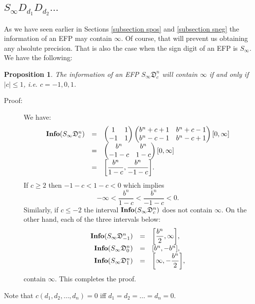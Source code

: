 \documentclass[11pt,a4paper]{article}
\newtheorem{prop}[tm]{Proposition}
\newenvironment{proof}
	{ \begin{description} \item[Proof:] \footnotesize }
	{ \end{description} }
\begin{document}
\subsection{$S_\infty D_{d_1} D_{d_2} \ldots$}
As we have seen earlier in Sections \ref{subsection spos} and
	\ref{subsection sneg} the information of an EFP may contain $\infty$.
	Of course, that will prevent us obtaining any absolute precision. That
	is also the case when the sign digit of an EFP is $S_\infty$. We have
	the following:
	\begin{prop} \label{prop:the information containing infty}
		The information of an EFP $S_\infty \mathfrak{D}_c^n$ will contain
		$\infty$ if and only if $|c| \le 1$, i.e. $c=-1,0,1$.
	\end{prop}
	\begin{proof}
		We have:
		\[ \begin{array}{rcl}
			{\bf Info} (S_\infty \mathfrak{D}_c^n) &=& \begin{pmatrix} 1&1\\-1&1
				\end{pmatrix} \begin{pmatrix} b^n+c+1 & b^n+c-1\\ b^n-c-1 & b^n-c+1
				\end{pmatrix} [0,\infty] \\
			&=& \begin{pmatrix} b^n & b^n \\ -1-c & 1-c \end{pmatrix} [0,\infty] \\
			&=& \displaystyle{ \left[ \frac{b^n}{1-c}, \frac{b^n}{-1-c} \right] }.
		\end{array} \]
		If $c \ge 2$ then $-1-c < 1-c <0$ which implies
		\[ -\infty < \frac{b^n}{1-c} < \frac{b^n}{-1-c} < 0. \]
		Similarly, if $c \le -2$ the interval ${\bf Info} (S_\infty
		\mathfrak{D}_c^n )$ does not contain $\infty$. On the other hand, each
		of the three intervals below:
		\[ \begin{array}{rcl}
			{\bf Info} (S_\infty \mathfrak{D}_{-1}^n) &=& \displaystyle{ \left[
				\frac{b^n}{2}, \infty \right] }, \\
			{\bf Info} (S_\infty \mathfrak{D}_0^n) &=& [b^n,-b^n], \\
			{\bf Info} (S_\infty \mathfrak{D}_1^n) &=& \displaystyle{ \left[
				\infty, -\frac{b^n}{2} \right] },
		\end{array} \]
		contain $\infty$. This completes the proof.
	\end{proof}
	Note that $c(d_1,d_2,\ldots,d_n)=0$ iff $d_1=d_2=\ldots=d_n=0$.
\end{document}
